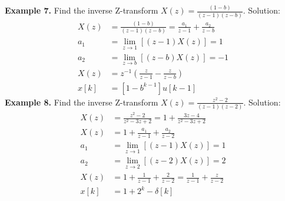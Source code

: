 \documentclass[twoside]{article}
\begin{document}
%
\textbf{Example 7.} Find the  inverse Z-transform $X(z) =
\frac{(1-b)}{(z-1) (z-b)}$. Solution:
%
\begin{align*}
    X(z) &= \frac{(1-b)}{(z-1) (z-b)} = \frac{a_1}{z-1} + 
                     \frac{a_2}{z-b} \\
    a_1 &= \lim_{z \to 1} \left[ (z - 1) X(z) \right] = 1 \\
    a_2 &= \lim_{z \to b} \left[ (z - b) X(z) \right] = -1 \\
   X(z) &= z^{-1} \left( \frac{z}{z-1} - \frac{z}{z-b} \right) \\
   x[k] &= [ 1 - b^{k-1} ] u[k-1]
\end{align*}
%
\textbf{Example 8.} Find the  inverse Z-transform $X(z) =
\frac{z^2 - 2}{(z-1) (z-2)}$. Solution:
%
\begin{align*}
X(z) &= \frac{z^2 - 2}{z^2 - 3 z + 2} = 1 + \frac{3z - 4}{z^2 - 3 z + 2}
\\
    X(z) &= 1 + \frac{a_1}{z-1} + \frac{a_2}{z-2} \\
    a_1 &= \lim_{z \to 1} \left[ (z -1) X(z) \right] = 1 \\
    a_2 &= \lim_{z \to 2} \left[ (z -2) X(z) \right] = 2 \\
   X(z) &= 1 +\frac{1}{z-1} + \frac{2}{z-2} = \frac{1}{z-1} +
          \frac{z}{z-2} \\
   x[k] &= 1 + 2^k - \delta[k] 
\end{align*}
%

\end{document}
